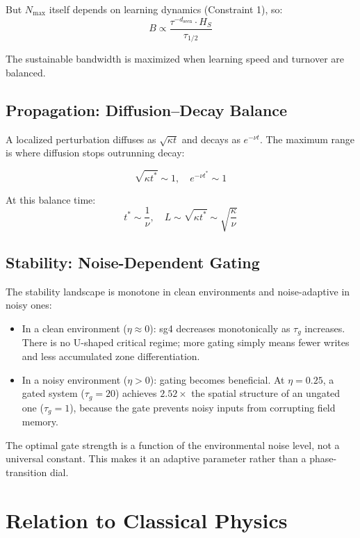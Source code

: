 \documentclass[11pt]{article}
\begin{document}
But $N_{\max}$ itself depends on learning dynamics (Constraint 1), so:
\begin{equation}
B \propto \frac{\tau^{-d_{\text{seen}}} \cdot H_S}{\tau_{1/2}}
\end{equation}

The sustainable bandwidth is maximized when learning speed and turnover are balanced.

\subsection{Propagation: Diffusion--Decay Balance}

A localized perturbation diffuses as $\sqrt{\kappa t}$ and decays as $e^{-\nu t}$. The maximum range is where diffusion stops outrunning decay:

\begin{equation}
\sqrt{\kappa t^*} \sim 1, \quad e^{-\nu t^*} \sim 1
\end{equation}

At this balance time:
\begin{equation}
t^* \sim \frac{1}{\nu}, \quad L \sim \sqrt{\kappa t^*} \sim \sqrt{\frac{\kappa}{\nu}}
\end{equation}

\subsection{Stability: Noise-Dependent Gating}

The stability landscape is monotone in clean environments and noise-adaptive in noisy ones:
\begin{itemize}
\item In a clean environment ($\eta \approx 0$): sg4 decreases monotonically as $\tau_g$ increases. There is no U-shaped critical regime; more gating simply means fewer writes and less accumulated zone differentiation.
\item In a noisy environment ($\eta > 0$): gating becomes beneficial. At $\eta = 0.25$, a gated system ($\tau_g = 20$) achieves $2.52\times$ the spatial structure of an ungated one ($\tau_g = 1$), because the gate prevents noisy inputs from corrupting field memory.
\end{itemize}

The optimal gate strength is a function of the environmental noise level, not a universal constant. This makes it an adaptive parameter rather than a phase-transition dial.

\section{Relation to Classical Physics}
\end{document}
